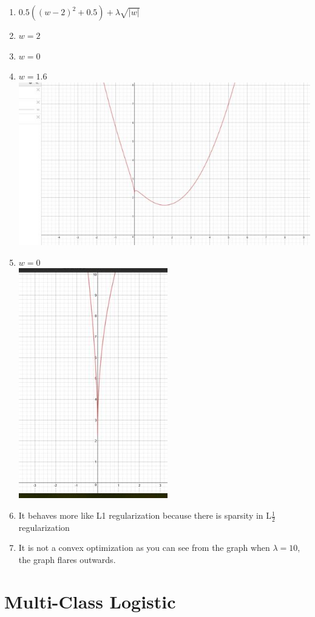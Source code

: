 \documentclass{article}
\begin{document}
\begin{enumerate}
\item $0.5((w-2)^2+0.5)+\lambda\sqrt{|w|}$
\item $w = 2$
\item $w = 0$
\item $w = 1.6$ \\ \includegraphics{263.jpg}
\item $w = 0$ \\ \includegraphics{264.jpg}
\item It behaves more like L1 regularization because there is sparsity in L$\frac12$ regularization
\item It is not a convex optimization as you can see from the graph when $\lambda = 10$, the graph flares outwards.
\end{enumerate}

\section{Multi-Class Logistic}
\end{document}
